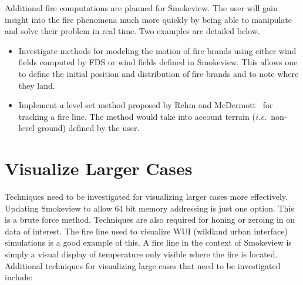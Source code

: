 \documentclass[11pt,twoside]{book}
\begin{document}
Additional fire computations are planned for Smokeview.  The user
will gain insight into the fire phenomena much more quickly by
being able to manipulate and solve their problem in real time. Two
examples are detailed below.

\begin{itemize}
\item  Investigate methods for modeling the motion of fire brands
using either wind fields computed by FDS or wind fields defined in
Smokeview. This allows one to define the initial position and
distribution of fire brands and to note where they land.

\item Implement a level set method proposed by Rehm and
McDermott~\cite{Rehm:LevelSet} for tracking a fire line.  The
method would take into account terrain ({\em i.e.}\ non-level
ground) defined by the user.
\end{itemize}

%
%

\section{Visualize Larger Cases}
Techniques need to be investigated for visualizing larger cases
more effectively.  Updating Smokeview to allow 64 bit memory
addressing is just one option.  This is a brute force method.
Techniques are also required for honing or zeroing in on data of
interest.  The fire line used to visualize WUI (wildland urban
interface) simulations is a good example of this.  A fire line in
the context of Smokeview is simply a visual display of temperature
only visible where the fire is located.  Additional techniques for
visualizing large cases that need to be investigated include:
\end{document}
